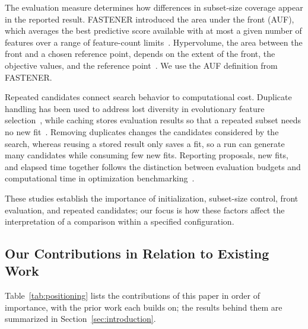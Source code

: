 The evaluation measure determines how differences in subset-size coverage appear in the reported result. FASTENER introduced the area under the front (AUF), which averages the best predictive score available with at most a given number of features over a range of feature-count limits~\cite{Koprivec2020}. Hypervolume, the area between the front and a chosen reference point, depends on the extent of the front, the objective values, and the reference point~\cite{Auger2012}. We use the AUF definition from FASTENER.

Repeated candidates connect search behavior to computational cost. Duplicate handling has been used to address lost diversity in evolutionary feature selection~\cite{Jiao2024PRDH,Wang2023Dup}, while caching stores evaluation results so that a repeated subset needs no new fit~\cite{Li2020GADMS}. Removing duplicates changes the candidates considered by the search, whereas reusing a stored result only saves a fit, so a run can generate many candidates while consuming few new fits. Reporting proposals, new fits, and elapsed time together follows the distinction between evaluation budgets and computational time in optimization benchmarking~\cite{BartzBeielstein2020}.

These studies establish the importance of initialization, subset-size control, front evaluation, and repeated candidates; our focus is how these factors affect the interpretation of a comparison within a specified configuration.

\subsection{Our Contributions in Relation to Existing Work}
\label{sec:positioning}

Table~\ref{tab:positioning} lists the contributions of this paper in order of importance, with the prior work each builds on; the results behind them are summarized in Section~\ref{sec:introduction}.

